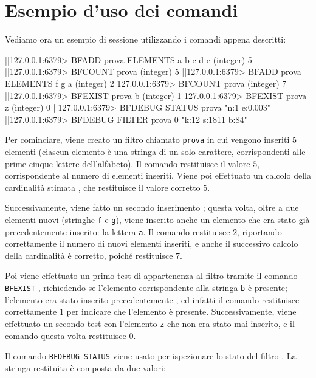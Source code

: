 \section{Esempio d'uso dei comandi}

Vediamo ora un esempio di sessione utilizzando i comandi appena descritti:

\medskip
\begin{commentedsource}[style=redis,caption=Esempio di utilizzo dei nuovi comandi per i filtri di Bloom]
|\lnote|127.0.0.1:6379> BFADD prova ELEMENTS a b c d e
(integer) 5
|\lnote|127.0.0.1:6379> BFCOUNT prova
(integer) 5
|\lnote|127.0.0.1:6379> BFADD prova ELEMENTS f g a
(integer) 2
127.0.0.1:6379> BFCOUNT prova
(integer) 7
|\lnote|127.0.0.1:6379> BFEXIST prova b
(integer) 1
127.0.0.1:6379> BFEXIST prova z
(integer) 0
|\lnote|127.0.0.1:6379> BFDEBUG STATUS prova
"n:1 e:0.003"
|\lnote|127.0.0.1:6379> BFDEBUG FILTER prova 0
"k:12 s:1811 b:84"
\end{commentedsource}

Per cominciare, viene creato un filtro chiamato \verb|prova|  in cui vengono inseriti 5
elementi (ciascun elemento è una stringa di un solo carattere, corrispondenti alle prime cinque
lettere dell'alfabeto). Il comando restituisce il valore $5$, corrispondente al numero di elementi
inseriti. Viene poi effettuato un calcolo della cardinalità stimata , che
restituisce il valore corretto $5$.

Successivamente, viene fatto un secondo inserimento ; questa volta, oltre a due
elementi nuovi (stringhe \verb|f| e \verb|g|), viene inserito anche un elemento che era stato
già precedentemente inserito: la lettera \verb|a|. Il comando restituisce $2$, riportando
correttamente il numero di nuovi elementi inseriti, e anche il successivo calcolo della
cardinalità è corretto, poiché restituisce $7$.

Poi viene effettuato un primo test di appartenenza al filtro tramite il comando \verb|BFEXIST|
, richiedendo se l'elemento corrispondente alla stringa \verb|b| è presente; l'elemento era
stato inserito precedentemente , ed infatti il comando restituisce correttamente $1$ per
indicare che l'elemento è presente. Successivamente, viene effettuato un secondo test con l'elemento
\verb|z| che non era stato mai inserito, e il comando questa volta restituisce $0$.

Il comando \verb|BFDEBUG STATUS| viene usato per ispezionare lo
stato del filtro . La stringa restituita è composta da due valori:

